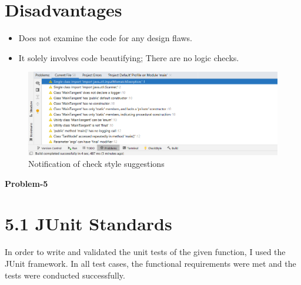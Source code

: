 \documentclass[12pt]{article}
\begin{document}
\section*{Disadvantages}
    \begin{itemize}
        \item Does not examine the code for any design flaws.
        \item It solely involves code beautifying; There are no logic checks.
    \end{itemize}
    
    \begin{figure}[h!]
    \centering
            \includegraphics[scale=0.7]{checkstyle.png}
                \caption{Notification of check style suggestions}
        \end{figure}
\newpage
\noindent
\Large\textbf{Problem-5}
\section*{5.1 JUnit Standards}
In order to write and validated the unit tests of the given function, I used the JUnit framework. In all test cases, the functional requirements were met and the tests were conducted successfully.
\end{document}
